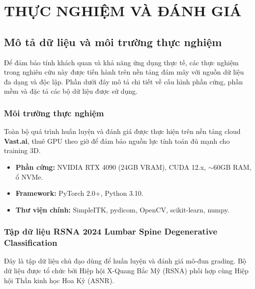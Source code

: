 \chapter{THỰC NGHIỆM VÀ ĐÁNH GIÁ}

\section{Mô tả dữ liệu và môi trường thực nghiệm}

Để đảm bảo tính khách quan và khả năng ứng dụng thực tế, các thực nghiệm trong nghiên cứu này được tiến hành trên nền tảng đám mây với nguồn dữ liệu đa dạng và độc lập. Phần dưới đây mô tả chi tiết về cấu hình phần cứng, phần mềm và đặc tả các bộ dữ liệu được sử dụng.

\subsection{Môi trường thực nghiệm}
Toàn bộ quá trình huấn luyện và đánh giá được thực hiện trên nền tảng cloud \textbf{Vast.ai}, thuê GPU theo giờ để đảm bảo nguồn lực tính toán đủ mạnh cho training 3D.
\begin{itemize}
    \item \textbf{Phần cứng:} NVIDIA RTX 4090 (24GB VRAM), CUDA 12.x, $\sim$60GB RAM, ổ NVMe.
    \item \textbf{Framework:} PyTorch 2.0+, Python 3.10.
    \item \textbf{Thư viện chính:} SimpleITK, pydicom, OpenCV, scikit-learn, numpy.
\end{itemize}

\subsection{Tập dữ liệu RSNA 2024 Lumbar Spine Degenerative Classification \cite{rsna2024dataset}}
Đây là tập dữ liệu chủ đạo dùng để huấn luyện và đánh giá mô-đun grading. Bộ dữ liệu được tổ chức bởi Hiệp hội X-Quang Bắc Mỹ (RSNA) phối hợp cùng Hiệp hội Thần kinh học Hoa Kỳ (ASNR).

